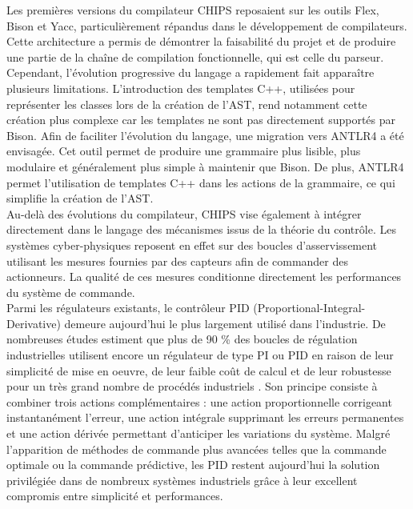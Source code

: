 Les premières versions du compilateur CHIPS reposaient sur les outils Flex, Bison et Yacc, particulièrement répandus dans le développement de compilateurs. Cette architecture a permis de démontrer la faisabilité du projet et de produire une partie de la chaîne de compilation fonctionnelle, qui est celle du parseur. Cependant, l'évolution progressive du langage a rapidement fait apparaître plusieurs limitations. L'introduction des templates C++, utilisées pour représenter les classes lors de la création de l'AST, rend notamment cette création plus complexe car les templates ne sont pas directement supportés par Bison. Afin de faciliter l'évolution du langage, une migration vers ANTLR4 a été envisagée. Cet outil permet de produire une grammaire plus lisible, plus modulaire et généralement plus simple à maintenir que Bison. De plus, ANTLR4 permet l'utilisation de templates C++ dans les actions de la grammaire, ce qui simplifie la création de l'AST. \\


Au-delà des évolutions du compilateur, CHIPS vise également à intégrer directement dans le langage des mécanismes issus de la théorie du contrôle. Les systèmes cyber-physiques reposent en effet sur des boucles d'asservissement utilisant les mesures fournies par des capteurs afin de commander des actionneurs. La qualité de ces mesures conditionne directement les performances du système de commande. \\

Parmi les régulateurs existants, le contrôleur PID (Proportional-Integral-Derivative) demeure aujourd'hui le plus largement utilisé dans l'industrie. De nombreuses études estiment que plus de 90 \% des boucles de régulation industrielles utilisent encore un régulateur de type PI ou PID en raison de leur simplicité de mise en oeuvre, de leur faible coût de calcul et de leur robustesse pour un très grand nombre de procédés industriels \cite{aastrom2006}.
Son principe consiste à combiner trois actions complémentaires : une action proportionnelle corrigeant instantanément l'erreur, une action intégrale supprimant les erreurs permanentes et une action dérivée permettant d'anticiper les variations du système. Malgré l'apparition de méthodes de commande plus avancées telles que la commande optimale ou la commande prédictive, les PID restent aujourd'hui la solution privilégiée dans de nombreux systèmes industriels grâce à leur excellent compromis entre simplicité et performances. \\

